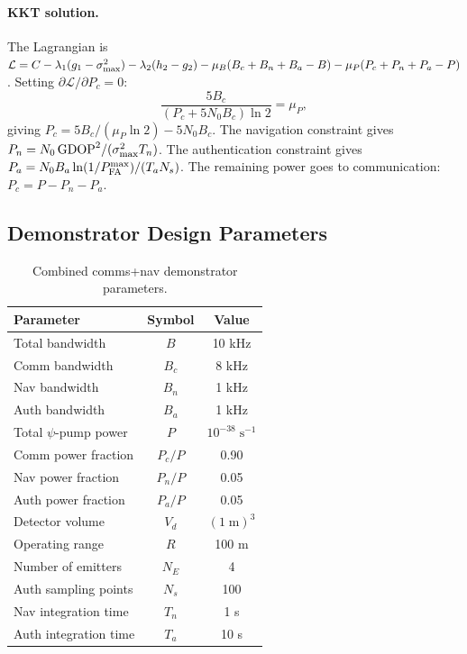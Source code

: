\documentclass[twocolumn,superscriptaddress,prd,nofootinbib]{revtex4-2}
\begin{document}
\paragraph{KKT solution.}
The Lagrangian is
$\mathcal{L} = C - \lambda_1(g_1 - \sigma_{\rm max}^2) - \lambda_2(h_2 - g_2) - \mu_B(B_c+B_n+B_a-B) - \mu_P(P_c+P_n+P_a-P)$.
Setting $\partial\mathcal{L}/\partial P_c = 0$:
\begin{equation}
\frac{5B_c}{(P_c + 5N_0 B_c)\ln 2} = \mu_P,
\end{equation}
giving $P_c = 5B_c/(\mu_P\ln 2) - 5N_0 B_c$.
The navigation constraint gives $P_n = N_0\,\text{GDOP}^2/(\sigma_{\rm max}^2 T_n)$.
The authentication constraint gives
$P_a = N_0 B_a\ln(1/P_{\rm FA}^{\rm max})/(T_a N_s)$.
The remaining power goes to communication:
$P_c = P - P_n - P_a$.

\subsection{Demonstrator Design Parameters}

\begin{table}[t]
\caption{Combined comms+nav demonstrator parameters.}
\label{tab:demonstrator}
\begin{ruledtabular}
\begin{tabular}{lcc}
Parameter & Symbol & Value \\
\hline
Total bandwidth & $B$ & 10 kHz \\
Comm bandwidth & $B_c$ & 8 kHz \\
Nav bandwidth & $B_n$ & 1 kHz \\
Auth bandwidth & $B_a$ & 1 kHz \\
Total $\psi$-pump power & $P$ & $10^{-38}\;\text{s}^{-1}$ \\
Comm power fraction & $P_c/P$ & 0.90 \\
Nav power fraction & $P_n/P$ & 0.05 \\
Auth power fraction & $P_a/P$ & 0.05 \\
Detector volume & $V_d$ & $(1\;\text{m})^3$ \\
Operating range & $R$ & 100 m \\
Number of emitters & $N_E$ & 4 \\
Auth sampling points & $N_s$ & 100 \\
Nav integration time & $T_n$ & 1 s \\
Auth integration time & $T_a$ & 10 s \\
\end{tabular}
\end{ruledtabular}
\end{table}
\end{document}
